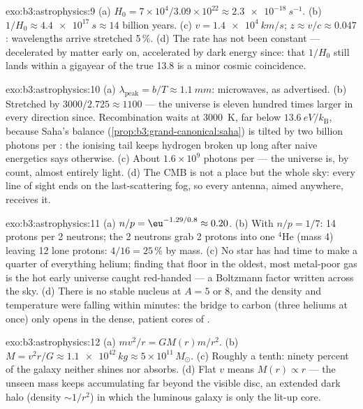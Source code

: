 \begin{solution}{exo:b3:astrophysics:9}
(a) $H_0 = 7\times10^4/3.09\times10^{22} \approx
\qty{2.3e-18}{s^{-1}}$. (b) $1/H_0 \approx \qty{4.4e17}{s}
\approx 14$ billion years. (c) $v = \qty{1.4e4}{km/s}$;
$z \approx v/c \approx 0.047$: wavelengths arrive stretched
5\,\%. (d) The rate has not been constant --- decelerated by
matter early on, accelerated by dark energy since: that
$1/H_0$ still lands within a gigayear of the true 13.8 is a
minor cosmic coincidence.
\end{solution}

\begin{solution}{exo:b3:astrophysics:10}
(a) $\lambda_{\text{peak}} = b/T \approx \qty{1.1}{mm}$:
microwaves, as advertised. (b) Stretched by $3000/2.725 \approx
1100$ --- the universe is eleven hundred times larger in every
direction since. Recombination waits at \qty{3000}{K}, far
below $\qty{13.6}{eV}/k_{\text{B}}$, because Saha's balance
(\cref{prop:b3:grand-canonical:saha}) is tilted by two billion
photons per : the ionising tail keeps hydrogen broken up
long after naive energetics says otherwise. (c) About
$1.6\times10^{9}$ photons per  --- the universe is, by
count, almost entirely light. (d) The CMB is not a place but
the whole sky: every line of sight ends on the last-scattering
fog, so every antenna, aimed anywhere, receives it.
\end{solution}

\begin{solution}{exo:b3:astrophysics:11}
(a) $n/p = \eu^{-1.29/0.8} \approx 0.20$. (b) With $n/p = 1/7$:
14 protons per 2 neutrons; the 2 neutrons grab 2 protons into
one $^4$He (mass 4) leaving 12 lone protons: $4/16 = 25\,\%$ by
mass. (c) No star has had time to make a quarter of everything
helium; finding that floor in the oldest, most metal-poor gas
is the hot early universe caught red-handed --- a Boltzmann
factor written across the sky. (d) There is no stable nucleus
at $A = 5$ or $8$, and the density and temperature were
falling within minutes: the bridge to carbon (three heliums at
once) only opens in the dense, patient cores of .
\end{solution}

\begin{solution}{exo:b3:astrophysics:12}
(a) $mv^2/r = GM(r)m/r^2$. (b) $M = v^2r/G \approx
\qty{1.1e42}{kg} \approx 5\times10^{11}\,M_\odot$. (c) Roughly
a tenth: ninety percent of the galaxy neither shines nor
absorbs. (d) Flat $v$ means $M(r) \propto r$ --- the unseen
mass keeps accumulating far beyond the visible disc, an
extended dark halo (density $\sim1/r^2$) in which the luminous
galaxy is only the lit-up core.
\end{solution}

